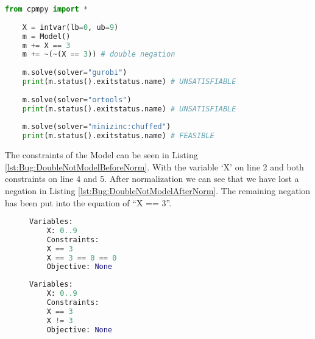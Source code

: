 \begin{lstlisting}[language=python, label={lst:Bug:DoubleNot}, caption={The “double negation”-bug.}]
	from cpmpy import *
	
	X = intvar(lb=0, ub=9)
	m = Model()
	m += X == 3
	m += ~(~(X == 3)) # double negation 
	
	m.solve(solver="gurobi")
	print(m.status().exitstatus.name) # UNSATISFIABLE
	
	m.solve(solver="ortools")
	print(m.status().exitstatus.name) # UNSATISFIABLE
	
	m.solve(solver="minizinc:chuffed")
	print(m.status().exitstatus.name) # FEASIBLE	
\end{lstlisting}

The constraints of the Model can be seen in Listing \ref{lst:Bug:DoubleNotModelBeforeNorm}. With the variable ‘X’ on line 2 and both constraints on line 4 and 5. After normalization we can see that we have lost a negation in Listing \ref{lst:Bug:DoubleNotModelAfterNorm}. The remaining negation has been put into the equation of “X == 3”.

\begin{figure}[h]
	\begin{minipage}{0.5\textwidth}
		\centering
\begin{lstlisting}[language=python, label={lst:Bug:DoubleNotModelBeforeNorm}, caption={The constraints of the “double negation”-bug \emph{before} the normalization process.}]
	Variables:
	X: 0..9
	Constraints:
	X == 3
	X == 3 == 0 == 0
	Objective: None
\end{lstlisting}
	\end{minipage}
	\begin{minipage}{0.5\textwidth}
		\centering
\begin{lstlisting}[language=python, label={lst:Bug:DoubleNotModelAfterNorm}, caption={The resulting constraints of the “double negation”-bug \emph{after} the normalization process.}]
	Variables:
	X: 0..9
	Constraints:
	X == 3
	X != 3
	Objective: None
\end{lstlisting}
	\end{minipage}
\end{figure}



